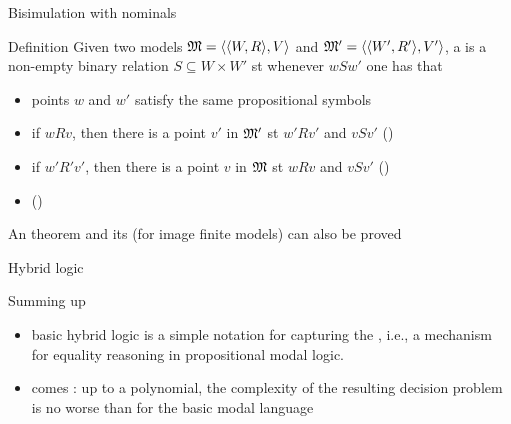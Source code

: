 \documentclass{beamer}
\begin{document}
\begin{slide}{Bisimulation with nominals}\label{s:50}
\small
\begin{block}{Definition}
Given two models $\mathfrak{M} = \mathopen{\langle}\mathopen{\langle}W, R\mathclose{\rangle}, V\mathclose{\rangle}$ and $\mathfrak{M}' = \mathopen{\langle}\mathopen{\langle}W', R'\mathclose{\rangle}, V'\mathclose{\rangle}$, a  is a non-empty binary relation
$S \subseteq W \times W'$  st whenever $w S w'$ one has that
\begin{itemize}
\item points $w$ and $w'$ satisfy the same propositional symbols 
\item if $w R v$, then there is a point $v'$ in $\mathfrak{M}'$ st  $w' R v'$ and $v S v'$ \hspace{0.3cm} ()
\item if $w' R' v'$, then there is a point $v$ in $\mathfrak{M}$ st  $w R v$ and $v S v'$ \hspace{0.3cm} ()
\item {} ()
\end{itemize}
\end{block}

An  theorem and its  (for image finite models) can also be proved

\end{slide}

\begin{slide}{Hybrid logic}\label{s:51a}
\small

\begin{block}{Summing up}
\begin{itemize}
\item basic hybrid logic is a simple notation for capturing  the , i.e., a mechanism for equality reasoning in propositional modal logic. 
\item comes : up to a polynomial, the complexity of the resulting decision problem is no worse than for the basic modal language
\end{itemize}
\end{block}
\end{slide}
\end{document}
